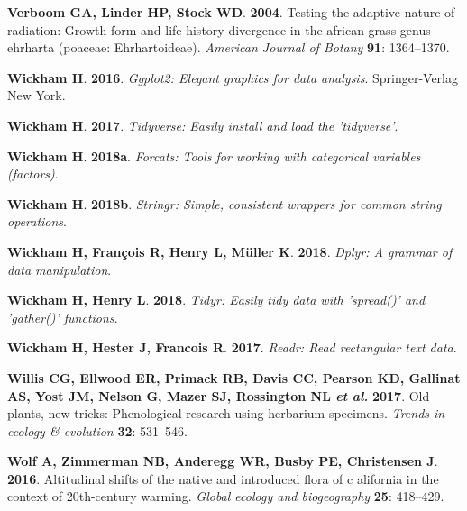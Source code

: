 \documentclass[man,floatsintext]{apa6}
\theoremstyle{definition}
\theoremstyle{definition}
\theoremstyle{definition}
\theoremstyle{remark}
\begin{document}
\leavevmode\hypertarget{ref-verboom2004testing}{}%
\textbf{\textnormal{Verboom GA}, \textnormal{Linder HP},
\textnormal{Stock WD}}. \textbf{2004}. Testing the adaptive nature of
radiation: Growth form and life history divergence in the african grass
genus ehrharta (poaceae: Ehrhartoideae). \emph{American Journal of
Botany} \textbf{91}: 1364--1370.

\leavevmode\hypertarget{ref-R-ggplot2}{}%
\textbf{\textnormal{Wickham H}}. \textbf{2016}. \emph{Ggplot2: Elegant
graphics for data analysis}. Springer-Verlag New York.

\leavevmode\hypertarget{ref-R-tidyverse}{}%
\textbf{\textnormal{Wickham H}}. \textbf{2017}. \emph{Tidyverse: Easily
install and load the 'tidyverse'}.

\leavevmode\hypertarget{ref-R-forcats}{}%
\textbf{\textnormal{Wickham H}}. \textbf{2018a}. \emph{Forcats: Tools
for working with categorical variables (factors)}.

\leavevmode\hypertarget{ref-R-stringr}{}%
\textbf{\textnormal{Wickham H}}. \textbf{2018b}. \emph{Stringr: Simple,
consistent wrappers for common string operations}.

\leavevmode\hypertarget{ref-R-dplyr}{}%
\textbf{\textnormal{Wickham H}, \textnormal{François R},
\textnormal{Henry L}, \textnormal{Müller K}}. \textbf{2018}.
\emph{Dplyr: A grammar of data manipulation}.

\leavevmode\hypertarget{ref-R-tidyr}{}%
\textbf{\textnormal{Wickham H}, \textnormal{Henry L}}. \textbf{2018}.
\emph{Tidyr: Easily tidy data with 'spread()' and 'gather()' functions}.

\leavevmode\hypertarget{ref-R-readr}{}%
\textbf{\textnormal{Wickham H}, \textnormal{Hester J},
\textnormal{Francois R}}. \textbf{2017}. \emph{Readr: Read rectangular
text data}.

\leavevmode\hypertarget{ref-willis2017old}{}%
\textbf{\textnormal{Willis CG}, \textnormal{Ellwood ER},
\textnormal{Primack RB}, \textnormal{Davis CC}, \textnormal{Pearson KD},
\textnormal{Gallinat AS}, \textnormal{Yost JM}, \textnormal{Nelson G},
\textnormal{Mazer SJ}, \textnormal{Rossington NL} \emph{et al.}}
\textbf{2017}. Old plants, new tricks: Phenological research using
herbarium specimens. \emph{Trends in ecology \& evolution} \textbf{32}:
531--546.

\leavevmode\hypertarget{ref-wolf2016altitudinal}{}%
\textbf{\textnormal{Wolf A}, \textnormal{Zimmerman NB},
\textnormal{Anderegg WR}, \textnormal{Busby PE}, \textnormal{Christensen
J}}. \textbf{2016}. Altitudinal shifts of the native and introduced
flora of c alifornia in the context of 20th-century warming.
\emph{Global ecology and biogeography} \textbf{25}: 418--429.
\end{document}
